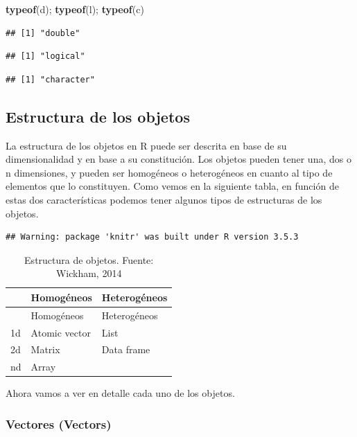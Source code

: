 \documentclass[]{article}
\newenvironment{Shaded}{\begin{snugshade}}{\end{snugshade}}
\newcommand{\KeywordTok}[1]{\textcolor[rgb]{0.13,0.29,0.53}{\textbf{{#1}}}}
\newcommand{\NormalTok}[1]{{#1}}
\begin{document}
\begin{Shaded}
\begin{Highlighting}[]
\KeywordTok{typeof}\NormalTok{(d); }\KeywordTok{typeof}\NormalTok{(l); }\KeywordTok{typeof}\NormalTok{(c)}
\end{Highlighting}
\end{Shaded}

\begin{verbatim}
## [1] "double"
\end{verbatim}

\begin{verbatim}
## [1] "logical"
\end{verbatim}

\begin{verbatim}
## [1] "character"
\end{verbatim}

\subsection{Estructura de los objetos}\label{estructura-de-los-objetos}

La estructura de los objetos en R puede ser descrita en base de su
dimensionalidad y en base a su constitución. Los objetos pueden tener
una, dos o n dimensiones, y pueden ser homogéneos o heterogéneos en
cuanto al tipo de elementos que lo constituyen. Como vemos en la
siguiente tabla, en función de estas dos características podemos tener
algunos tipos de estructuras de los objetos.

\begin{verbatim}
## Warning: package 'knitr' was built under R version 3.5.3
\end{verbatim}

\begin{longtable}[]{@{}lll@{}}
\caption{Estructura de objetos. Fuente: Wickham, 2014}\tabularnewline
\toprule
& Homogéneos & Heterogéneos\tabularnewline
\midrule
\endfirsthead
\toprule
& Homogéneos & Heterogéneos\tabularnewline
\midrule
\endhead
1d & Atomic vector & List\tabularnewline
2d & Matrix & Data frame\tabularnewline
nd & Array &\tabularnewline
\bottomrule
\end{longtable}

Ahora vamos a ver en detalle cada uno de los objetos.

\subsubsection{Vectores (Vectors)}\label{vectores-vectors}
\end{document}
